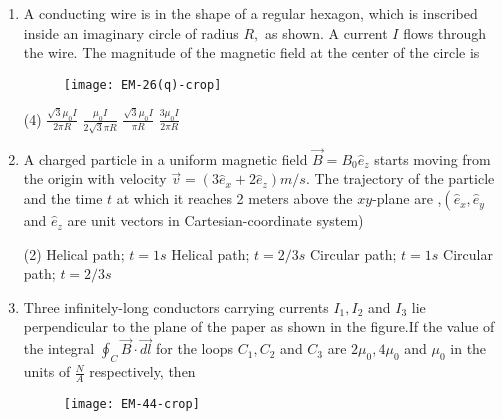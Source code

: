 \begin{enumerate}[ label=\color{ocre}\textbf{\arabic*.}]
	\begin{tasks}(4)
		\task[\textbf{a.}]$\frac{\pi^{2} m E}{2 q B^{2}}$
		\task[\textbf{b.}]$\frac{2 \pi^{2} m E}{q B^{2}}$
		\task[\textbf{c.}] $\frac{\pi^{2} m E}{q B^{2}}+\frac{v_{0} \pi m}{q B}$
		\task[\textbf{d.}]   $\frac{2 \pi m v_{0}}{q B}$
	\end{tasks}
	
	\item A conducting wire is in the shape of a regular hexagon, which is inscribed inside an imaginary circle of radius $R,$ as shown. A current $I$ flows through the wire. The magnitude of the magnetic field at the center of the circle is {}
	\begin{figure}[H]
		\begin{center}
			\texttt{[image: EM-26(q)-crop]}
		\end{center}
	\end{figure}
	\begin{tasks}(4)
		\task[\textbf{a.}]$\frac{\sqrt{3} \mu_{0} I}{2 \pi R}$
		\task[\textbf{b.}]$\frac{\mu_{0} I}{2 \sqrt{3} \pi R}$
		\task[\textbf{c.}]$\frac{\sqrt{3} \mu_{0} I}{\pi R}$
		\task[\textbf{d.}] $\frac{3 \mu_{0} I}{2 \pi R}$
	\end{tasks}
	\item A charged particle in a uniform magnetic field $\vec{B}=B_{0} \hat{e}_{z}$ starts moving from the origin with velocity $\vec{v}=\left(3 \hat{e}_{x}+2 \hat{e}_{z}\right) m / s$. The trajectory of the particle and the time $t$ at which it reaches 2 meters above the $x y$-plane are ,$\left(\hat{e}_{x}, \hat{e}_{y}\right.$ and $\hat{e}_{z}$ are unit vectors in Cartesian-coordinate system){}
	\begin{tasks}(2)
		\task[\textbf{a.}] Helical path; $t=1 s$
		\task[\textbf{b.}]Helical path; $t=2 / 3 s$
		\task[\textbf{c.}] Circular path; $t=1 s$
		\task[\textbf{d.}]  Circular path; $t=2 / 3 s$
	\end{tasks}
	\item Three infinitely-long conductors carrying currents $I_{1}, I_{2}$ and $I_{3}$ lie perpendicular to the plane of the paper as shown in the figure.If the value of the integral $\oint_{C} \vec{B} \cdot \overrightarrow{d l}$ for the loops $C_{1}, C_{2}$ and $C_{3}$ are $2 \mu_{0}, 4 \mu_{0}$ and $\mu_{0}$ in the units of $\frac{N}{A}$ respectively, then{}
	\begin{figure}[H]
		\begin{center}
			\texttt{[image: EM-44-crop]}

\end{center}
\end{figure}
\end{enumerate}
